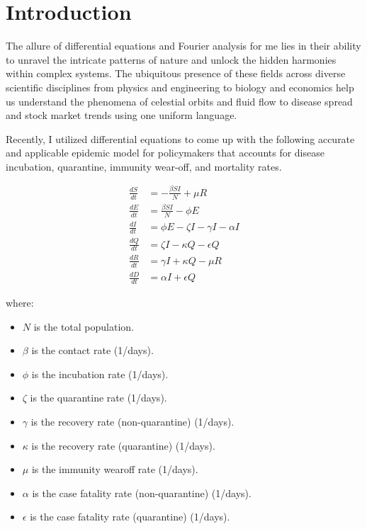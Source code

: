 \section{Introduction}
\label{section:introduction} 
The allure of differential equations and Fourier analysis for me lies in their ability to unravel the intricate patterns of nature and unlock the hidden harmonies within complex systems. 
The ubiquitous presence of these fields across diverse scientific disciplines from physics and engineering to biology and economics help us understand the phenomena of celestial orbits and fluid flow to disease spread and stock market trends using one uniform language. 

Recently, I utilized differential equations to come up with the following accurate and applicable epidemic model for policymakers that accounts for disease incubation, quarantine, immunity wear-off, and mortality rates.

\begin{align}        
    \frac{dS}{dt} &= -\frac{\beta S I}{N} + \mu R \\
    \frac{dE}{dt} &= \frac{\beta S I}{N} - \phi E \\
    \frac{dI}{dt} &= \phi E - \zeta I - \gamma I - \alpha I \\
    \frac{dQ}{dt} &= \zeta I - \kappa Q - \epsilon Q \\
    \frac{dR}{dt} &= \gamma I + \kappa Q - \mu R \\
    \frac{dD}{dt} &= \alpha I + \epsilon Q
\end{align}

\noindent
where:
\begin{itemize}
    \item $N$ is the total population.
    \item $\beta$ is the contact rate (1/days).
    \item $\phi$ is the incubation rate (1/days).
    \item $\zeta$ is the quarantine rate (1/days).
    \item $\gamma$ is the recovery rate (non-quarantine) (1/days).
    \item $\kappa$ is the recovery rate (quarantine) (1/days).
    \item $\mu$ is the immunity wearoff rate (1/days).
    \item $\alpha$ is the case fatality rate (non-quarantine) (1/days).
    \item $\epsilon$ is the case fatality rate (quarantine) (1/days).
\end{itemize}

